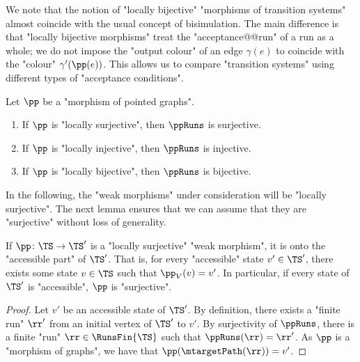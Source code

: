 \documentclass[10pt,a4paper]{amsart}
\renewcommand{\gg}{\gamma}
\begin{document}
We note that the notion of "locally bijective" "morphisms of transition systems" almost coincide with the usual concept of bisimulation. The main difference is that "locally bijective morphisms" treat the "acceptance@@run" of a run as a whole; we do not impose the "output colour" of an edge $\gg(e)$ to coincide with the "colour" $\gg'(\pp(e))$. This allows us to compare "transition systems" using different types of "acceptance conditions".

\begin{remark}\label{rmk-morph:loc-morph-bijection-runs}
	Let $\pp$ be a "morphism of pointed graphs".
	\begin{enumerate}
		\item If $\pp$ is "locally surjective", then $\ppRuns$ is surjective.
		\item If $\pp$ is "locally injective", then $\ppRuns$ is injective.
		\item If $\pp$ is "locally bijective", then $\ppRuns$ is bijective.
	\end{enumerate}
\end{remark}



In the following, the "weak morphisms" under consideration will be "locally surjective". The next lemma ensures that we can assume that they are "surjective" without loss of generality.

\begin{lemma}\label{lemma-morph:locSurjMorph_OntoAccessible}
	If $\pp\colon \TS \to \TS'$ is a "locally surjective" "weak morphism", it is onto the "accessible part" of $\TS'$. That is, for every "accessible" state $v'\in \TS'$, there exists some state $v\in \TS$ such that $\pp_V(v)=v'$. In particular, if every state of $\TS'$ is "accessible", $\pp$ is "surjective".
\end{lemma}
\begin{proof}
	 Let $v'$ be an accessible state of $\TS'$. By definition, there exists a "finite run" $\rr'$ from an initial vertex of $\TS'$ to $v'$. By surjectivity of $\ppRuns$, there is a finite "run" $\rr\in \RunsFin{\TS}$ such that $\ppRuns(\rr) = \rr'$. As $\pp$ is a "morphism of graphs", we have that $\pp(\mtargetPath(\rr)) = v'$.
\end{proof}
\end{document}

